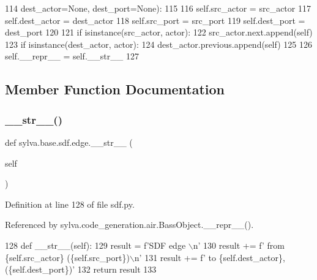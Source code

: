 \begin{DoxyCode}
114                      dest\_actor=\textcolor{keywordtype}{None}, dest\_port=\textcolor{keywordtype}{None}):
115 
116             self.src\_actor = src\_actor
117             self.dest\_actor = dest\_actor
118             self.src\_port = src\_port
119             self.dest\_port = dest\_port
120 
121             \textcolor{keywordflow}{if} isinstance(src\_actor, actor):
122                 src\_actor.next.append(self)
123             \textcolor{keywordflow}{if} isinstance(dest\_actor, actor):
124                 dest\_actor.previous.append(self)
125 
126             self.\_\_repr\_\_ = self.\_\_str\_\_
127 
\end{DoxyCode}


\subsection{Member Function Documentation}
\mbox{\label{classsylva_1_1base_1_1sdf_1_1edge_aec8cfee02481374bcbd68fb91d0afb1a}} 
\subsubsection{\texorpdfstring{\+\_\+\+\_\+str\+\_\+\+\_\+()}{\_\_str\_\_()}}
{\footnotesize\ttfamily def sylva.\+base.\+sdf.\+edge.\+\_\+\+\_\+str\+\_\+\+\_\+ (\begin{DoxyParamCaption}\item[{}]{self }\end{DoxyParamCaption})}



Definition at line 128 of file sdf.\+py.



Referenced by sylva.\+code\+\_\+generation.\+air.\+Bass\+Object.\+\_\+\+\_\+repr\+\_\+\+\_\+().


\begin{DoxyCode}
128         \textcolor{keyword}{def }\_\_str\_\_(self):
129             result = f\textcolor{stringliteral}{'SDF edge \(\backslash\)n'}
130             result += f\textcolor{stringliteral}{'  from \{self.src\_actor\} (\{self.src\_port\})\(\backslash\)n'}
131             result += f\textcolor{stringliteral}{'  to \{self.dest\_actor\}, (\{self.dest\_port\})'}
132             \textcolor{keywordflow}{return} result
133 
\end{DoxyCode}
\mbox{\label{classsylva_1_1base_1_1sdf_1_1edge_a1b17c24443ba7f3dc4b81c4a73ebe699}} 
